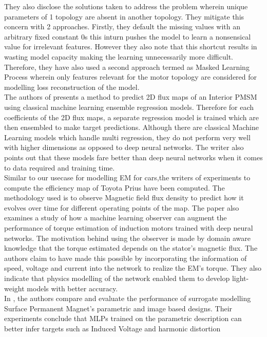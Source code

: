 \documentclass{report} %
\begin{document}
They also disclose the solutions taken to address the problem wherein unique parameters of 1 topology are absent in another topology.
They mitigate this concern with 2 approaches. Firstly, they default the missing values with an arbitrary fixed constant 0s this inturn 
pushes the model to learn a nonsensical value for irrelevant features.
However they also note that this shortcut results in wasting model capacity making the learning unnecessarily more difficult.
Therefore, they have also used a second approach termed as Masked Learning Process wherein only features relevant for the motor topology are 
considered for modelling loss reconstruction of the model. \\
The authors of \cite{EM 2DFMP-2022} presents a method to predict 2\ac{D} flux maps of an Interior \ac{PMSM} using classical machine learning ensemble regression models.
Therefore for each coefficients of the 2\ac{D} flux maps, a separate regression model is trained which are then ensembled to make target predictions. 
Although there are classical Machine Learning models which handle multi regression, they do not perform very well with higher dimensions as 
opposed to deep neural networks. The writer also points out that these models fare better than deep neural networks when it comes to data required and training time.\\
Similar to our usecase for modelling \ac{EM} for cars,the writers of \cite{ETA-V-2020} experiments to compute the efficiency map of Toyota Prius have 
been computed. The methodology used is to observe Magnetic field flux density to predict how it evolves over time for different operating points of the map.
The paper \cite{HMLO-2021} also examines a study of how a machine learning observer can augment the performance of torque estimation of 
induction motors trained with deep neural networks.
The motivation behind using the observer is made by domain aware knowledge that the torque estimated depends on the stator's magnetic flux.
The authors claim to have made this possible by incorporating the information of speed, voltage and current into the network to realize the \ac{EM}'s torque.
They also indicate that physics modelling of the network enabled them to develop light-weight models with better accuracy.\\
In \cite{EM SM-2023}, the authors compare and evaluate the performance of surrogate modelling Surface Permanent Magnet's parametric and image based designs.
Their experiments conclude that \ac{MLP}s trained on the parametric description can better infer targets such as Induced Voltage and harmonic distortion 
\end{document}
